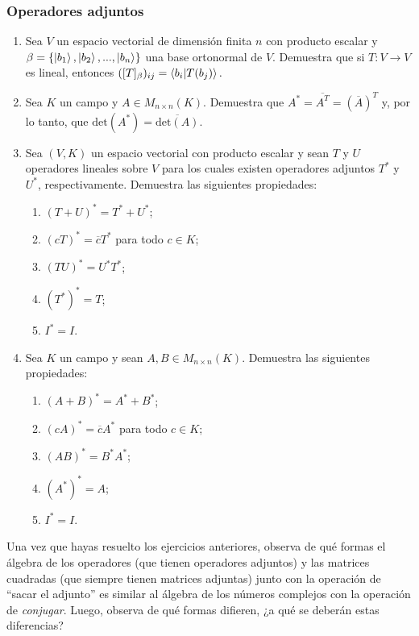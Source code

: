 \documentclass[12pt,dvipsnames]{article}
\begin{document}
\subsubsection{Operadores adjuntos} \label{Ejer:Operadores adjuntos}
\begin{enumerate}
    \item Sea $V$ un espacio vectorial de dimensión finita $n$ con producto escalar y $\beta=\{\ket{b_1},\ket{b_2},...,\ket{b_n}\}$ una base ortonormal de $V$. Demuestra que si $T:V\to V$ es lineal, entonces $([T]_\beta)_{ij}=\braket{b_i|T(b_j)}.$
    \item Sea $K$ un campo y $A\in M_{n\times n}(K)$. Demuestra que
    $A^*=\overline{A^T}=(\overline{A})^T$ y, por lo tanto, que $\text{det}(A^*)=\overline{\text{det}(A)}$.
    \item Sea $(V,K)$ un espacio vectorial con producto escalar y sean $T$ y $U$ operadores lineales sobre $V$ para los cuales existen operadores adjuntos $T^*$ y $U^*$, respectivamente. Demuestra las siguientes propiedades:
        \begin{enumerate}[label=\alph*)]
            \item $(T+U)^*=T^*+U^*$;
            \item $(cT)^*=\overline{c}T^*$ para todo $c\in K$;
            \item $(TU)^*=U^*T^*$;
            \item $(T^*)^*=T$;
            \item $I^*=I$.
        \end{enumerate}
    \item Sea $K$ un campo y sean $A,B\in M_{n\times n}(K)$. Demuestra las siguientes propiedades:
        \begin{enumerate}[label=\alph*)]
            \item $(A+B)^*=A^*+B^*$;
            \item $(cA)^*=\overline{c}A^*$ para todo $c\in K$;
            \item $(AB)^*=B^*A^*$;
            \item $(A^*)^*=A$;
            \item $I^*=I$.
        \end{enumerate}
\end{enumerate}

Una vez que hayas resuelto los ejercicios anteriores, observa de qué formas el álgebra de los operadores (que tienen operadores adjuntos) y las matrices cuadradas (que siempre tienen matrices adjuntas) junto con la operación de ``sacar el adjunto'' es similar al álgebra de los números complejos con la operación de \emph{conjugar}. Luego, observa de qué formas difieren, ¿a qué se deberán estas diferencias?
\end{document}
